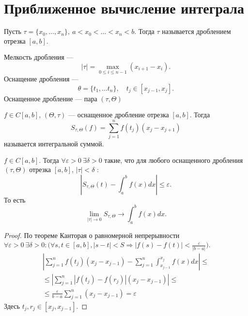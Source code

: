 \section{Приближенное вычисление интеграла}
\begin{defn}[Дробление]
    Пусть $ \tau = \{x_0, \ldots , x_{n}\}, ~ a < x_0 < \ldots < x_{n}< b$. Тогда $ \tau $ называется {\sf дроблением отрезка} $ [a, b]$. 

    {\sf Мелкость дробления} --- \[
	\left| \tau \right| = \max_{0 \le i \le n-1} (x_{i+1} - x_i)
    .\]  
    {\sf Оснащение дробления} --- \[
	\theta = \{t_1, \ldots t_n\}, \quad t_j \in [x_{j-1}, x_j]
    .\]     
    {\sf Оснащенное дробление} --- пара $ ( \tau,\Theta )$ 
\end{defn}
\begin{defn}
    $ f \in C[a, b]$, $ (\Theta, \tau )$ --- оснащенное дробление отрезка $ [a, b]$. Тогда \[
	S_{\tau, \Theta} (f) = \sum_{j=1}^{n} f(t_j)(x_j-x_{j+1})
    \] 
называется {\sf интегральной суммой}. 
\end{defn}
\begin{thm}
    $ f \in  C[a, b]$. Тогда $ \forall \varepsilon >0 ~ \exists \delta >0$ такие, что для любого оснащенного дробления $( \tau , \Theta)$ отрезка $ [a, b]$, $ \lvert \tau \rvert < \delta $ :
    \[
	\left| S_{\tau, \Theta}(t) - \int_{a}^{b} f(x) dx  \right| \le \varepsilon 
    .\] 
    То есть 
    \[
	\lim_{\lvert \tau  \rvert \to 0} S_{\tau, \Theta} \to  \int_{a}^{b} f(x)dx 
    .\] 
\end{thm}
\begin{proof}
    По теореме Канторая о равномерной непрерывности $ \forall \varepsilon >0 ~ \exists \delta >0\colon \bigl( \forall s, t \in  [a , b], \lvert s-t \rvert < S \Longrightarrow \lvert f(s) - f(t) \rvert < \frac{ \varepsilon }{\lvert b-a \rvert } \bigr)$.
    \begin{align*}
    \left| \sum_{j=1}^{n} f(t_j) (x_j-x_{j-1}) - \sum_{j=1}^{n}  \int_{x_{j-1}}^{x_j} f(x)dx  \right| \le \\
\le \left| \sum_{j=1}^{n} \left| f(t_j) - f(r_j) \right| (x_j - x_{j-1}) \right| \le \\
\le \frac{ \varepsilon }{b-a} \sum_{j=1}^{n} (x_j - x_{j-1}) = \varepsilon 
    \end{align*}
    Здесь $ t_j, r_j \in  [x_j, x_{j-1}]$.
\end{proof}
% 
